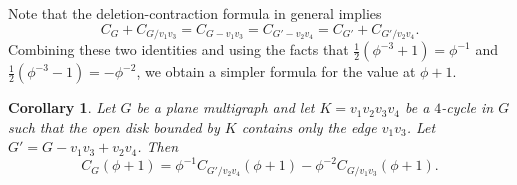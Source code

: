 \documentclass[12pt,twoside,openright,a4paper]{book}
\newtheorem{corollary}[theorem]{Corollary}
\begin{document}
Note that the deletion-contraction formula in general implies
\begin{equation}\label{eq:delconcon}
C_G+C_{G/v_1v_3}=C_{G-v_1v_3}=C_{G'-v_2v_4}=C_{G'}+C_{G'/v_2v_4}.
\end{equation}
Combining these two identities
and using the facts that $\frac{1}{2}(\phi^{-3}+1)=\phi^{-1}$ and $\frac{1}{2}(\phi^{-3}-1)=-\phi^{-2}$,
we obtain a simpler formula for the value at $\phi+1$.

\begin{corollary}\label{cor:tutte}
Let $G$ be a plane multigraph and let $K=v_1v_2v_3v_4$ be a $4$-cycle in $G$ such that the open disk bounded by $K$
contains only the edge $v_1v_3$.  Let $G'=G-v_1v_3+v_2v_4$.  Then
$$C_G(\phi+1)=\phi^{-1}C_{G'/v_2v_4}(\phi+1)-\phi^{-2}C_{G/v_1v_3}(\phi+1).$$
\end{corollary}
\end{document}
